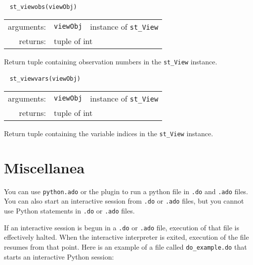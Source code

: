 \documentclass{article}
\begin{document}
			
			\ \newline
			\noindent \lstinline$st_viewobs(viewObj)$
								
			\vspace{1.5mm}
			\noindent 
			\indent \begin{tabular}{rrl}
				arguments: & \texttt{viewObj} & instance of \lstinline$st_View$ \\
					returns: & \multicolumn{2}{l}{tuple of int}
				\end{tabular}
								
			\vspace{1.5mm}
			\noindent Return tuple containing observation numbers in the \lstinline$st_View$ instance. \newline
			
			
			\ \newline
			\noindent \lstinline$st_viewvars(viewObj)$
								
			\vspace{1.5mm}
			\noindent 
			\indent \begin{tabular}{rrl}
				arguments: & \texttt{viewObj} & instance of \lstinline$st_View$ \\
					returns: & \multicolumn{2}{l}{tuple of int}
				\end{tabular}
								
			\vspace{1.5mm}
			\noindent Return tuple containing the variable indices in the \lstinline$st_View$ instance. \newline



\section{Miscellanea} \label{misc}
		
		You can use \lstinline$python.ado$ or the plugin to run a python file in \lstinline$.do$ and \lstinline$.ado$ files. You can also start an interactive session from \lstinline$.do$ or \lstinline{.ado} files, but you cannot use Python statements in \lstinline$.do$ or \lstinline$.ado$ files.
		
		If an interactive session is begun in a \lstinline{.do} or \lstinline{.ado} file, execution of that file is effectively halted. When the interactive interpreter is exited, execution of the file resumes from that point. Here is an example of a file called \lstinline$do_example.do$ that starts an interactive Python session: \newline
\end{document}
